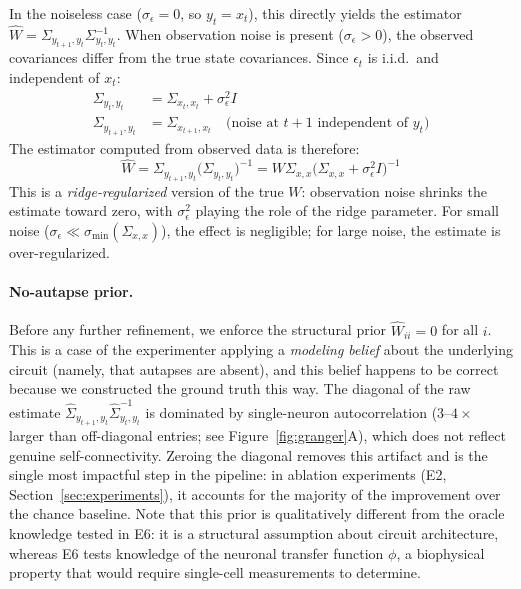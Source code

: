 \documentclass{article}
\begin{document}
In the noiseless case ($\sigma_\epsilon = 0$, so $y_t = x_t$), this directly yields the estimator $\hat{W} = \Sigma_{y_{t+1}, y_t} \Sigma_{y_t, y_t}^{-1}$.
When observation noise is present ($\sigma_\epsilon > 0$), the observed covariances differ from the true state covariances.
Since $\epsilon_t$ is i.i.d.\ and independent of $x_t$:
\begin{align}
    \Sigma_{y_t, y_t} &= \Sigma_{x_t, x_t} + \sigma_\epsilon^2 I \label{eq:noisy_cov} \\
    \Sigma_{y_{t+1}, y_t} &= \Sigma_{x_{t+1}, x_t} \quad \text{(noise at $t{+}1$ independent of $y_t$)}
\end{align}
The estimator computed from observed data is therefore:
\begin{equation}
    \hat{W} = \Sigma_{y_{t+1}, y_t} \bigl(\Sigma_{y_t, y_t}\bigr)^{-1} = W \Sigma_{x,x} \bigl(\Sigma_{x,x} + \sigma_\epsilon^2 I\bigr)^{-1}
    \label{eq:estimator}
\end{equation}
This is a \emph{ridge-regularized} version of the true $W$: observation noise shrinks the estimate toward zero, with $\sigma_\epsilon^2$ playing the role of the ridge parameter.
For small noise ($\sigma_\epsilon \ll \sigma_{\min}(\Sigma_{x,x})$), the effect is negligible; for large noise, the estimate is over-regularized.

\paragraph{No-autapse prior.}
Before any further refinement, we enforce the structural prior $\hat{W}_{ii} = 0$ for all $i$.
This is a case of the experimenter applying a \emph{modeling belief} about the underlying circuit (namely, that autapses are absent), and this belief happens to be correct because we constructed the ground truth this way.
The diagonal of the raw estimate $\hat{\Sigma}_{y_{t+1},y_t} \hat{\Sigma}_{y_t,y_t}^{-1}$ is dominated by single-neuron autocorrelation ($3$--$4\times$ larger than off-diagonal entries; see Figure~\ref{fig:granger}A), which does not reflect genuine self-connectivity.
Zeroing the diagonal removes this artifact and is the single most impactful step in the pipeline: in ablation experiments (E2, Section~\ref{sec:experiments}), it accounts for the majority of the improvement over the chance baseline.
Note that this prior is qualitatively different from the oracle knowledge tested in E6: it is a structural assumption about circuit architecture, whereas E6 tests knowledge of the neuronal transfer function $\phi$, a biophysical property that would require single-cell measurements to determine.
\end{document}
